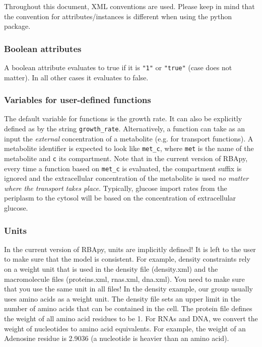 \documentclass[12pt]{scrartcl}
\begin{document}
Throughout this document, XML conventions are used.
Please keep in mind that the convention for attributes/instances is different when using the
python package.

\subsubsection{Boolean attributes}

A boolean attribute evaluates to true if it is \texttt{"1"}
or \texttt{"true"} (case does not matter).
In all other cases it evaluates to false.

\subsubsection{Variables for user-defined functions}

The default variable for functions is the growth rate.
It can also be explicitly defined as by the string \texttt{growth\_rate}.
Alternatively, a function can take as an input the \emph{external}
concentration of a metabolite (e.g. for transport functions).
A metabolite identifier is expected to look like \texttt{met\_c},
where \texttt{met} is the name of the metabolite
and \texttt{c} its compartment.
Note that in the current version of RBApy,
every time a function based on \texttt{met\_c} is evaluated,
the compartment suffix is ignored and the extracellular concentration of the metabolite is used
\emph{no matter where the transport takes place}.
Typically, glucose import rates from the periplasm to the cytosol
will be based on the concentration of extracellular glucose.

\subsubsection{Units}

In the current version of RBApy, units are implicitly defined!
It is left to the user to make sure that the model is consistent.
For example, density constraints rely on a weight unit that is used in the
density file (density.xml) and the macromolecule files (proteins.xml, rnas.xml,
dna.xml).
You need to make sure that you use the same unit in all files!
In the density example, our group usually uses amino acids as a weight unit.
The density file sets an upper limit in the number of amino acids that can be
contained in the cell.
The protein file defines the weight of all amino acid residues to be 1.
For RNAs and DNA, we convert the weight of nucleotides to amino acid equivalents.
For example, the weight of an Adenosine residue is 2.9036
(a nucleotide is heavier than an amino acid).








\end{document}
